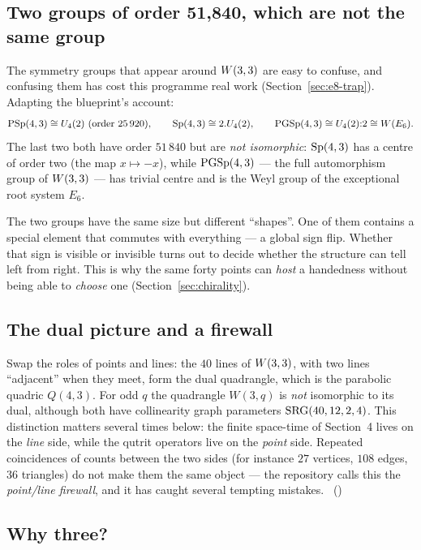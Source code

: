 \subsection{Two groups of order 51,840, which are not the same group}

The symmetry groups that appear around $W(3,3)$ are easy to confuse, and confusing them has
cost this programme real work (Section~\ref{sec:e8-trap}). Adapting the blueprint's
account:
\[
\PSp(4,3)\cong U_4(2)\ (\text{order }25\,920),\qquad
\Sp(4,3)\cong 2.U_4(2),\qquad
\PGSp(4,3)\cong U_4(2){:}2\cong W(E_6).
\]
The last two both have order $51\,840$ but are \emph{not isomorphic}: $\mathrm{Sp}(4,3)$ has a
centre of order two (the map $x\mapsto -x$), while $\mathrm{PGSp}(4,3)$ --- the full automorphism
group of $W(3,3)$ --- has trivial centre and is the Weyl group of the exceptional root system
$E_6$. \tierT

\begin{plainwords}
The two groups have the same size but different ``shapes''. One of them contains a
special element that commutes with everything --- a global sign flip. Whether that sign
is visible or invisible turns out to decide whether the structure can tell left from
right. This is why the same forty points can \emph{host} a handedness without being able
to \emph{choose} one (Section~\ref{sec:chirality}).
\end{plainwords}

\subsection{The dual picture and a firewall}

Swap the roles of points and lines: the $40$ lines of $W(3,3)$, with two lines ``adjacent''
when they meet, form the dual quadrangle, which is the parabolic quadric $Q(4,3)$. For odd
$q$ the quadrangle $W(3,q)$ is \emph{not} isomorphic to its dual, although both have
collinearity graph parameters $\mathrm{SRG}(40,12,2,4)$. This distinction matters several times
below: the finite space-time of Section~4 lives on the \emph{line} side, while the
qutrit operators live on the \emph{point} side. Repeated coincidences of counts between the
two sides (for instance $27$ vertices, $108$ edges, $36$ triangles) do not make them the
same object --- the repository calls this the \emph{point/line firewall}, and it has
caught several tempting mistakes. \tierC\ ()

\subsection{Why three?}

